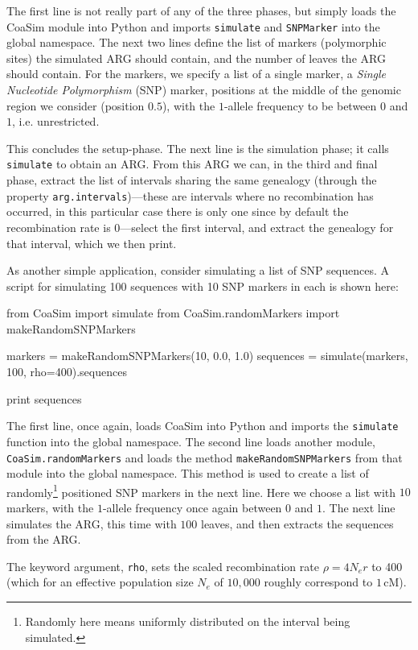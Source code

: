 \documentclass{manual}
\newcommand{\cM}{\mathrm{cM}}
\begin{document}
The first line is not really part of any of the three phases, but
simply loads the CoaSim module into Python and imports
\texttt{simulate} and \texttt{SNPMarker} into the global namespace.
The next two lines define the list of markers (polymorphic sites) the
simulated ARG should contain, and the number of leaves the ARG should
contain.  For the markers, we specify a list of a single marker, a
\emph{Single Nucleotide Polymorphism} (SNP) marker, positions at the
middle of the genomic region we consider (position $0.5$), with the
$1$-allele frequency to be between $0$ and $1$, i.e. unrestricted.

This concludes the setup-phase.  The next line is the simulation
phase; it calls \texttt{simulate} to obtain an ARG.  From this ARG we
can, in the third and final phase, extract the list of intervals
sharing the same genealogy (through the property
\texttt{arg.intervals})---these are intervals where no recombination
has occurred, in this particular case there is only one since by
default the recombination rate is $0$---select the first interval, and
extract the genealogy for that interval, which we then print.

As another simple application, consider simulating a list of SNP
sequences.  A script for simulating 100 sequences with 10 SNP markers
in each is shown here:
\begin{code}
from CoaSim import simulate
from CoaSim.randomMarkers import makeRandomSNPMarkers

markers = makeRandomSNPMarkers(10, 0.0, 1.0)
sequences = simulate(markers, 100, rho=400).sequences

print sequences
\end{code}

The first line, once again, loads CoaSim into Python and imports the
\texttt{simulate} function into the global namespace.  The second line
loads another module, \texttt{CoaSim.randomMarkers} and loads the
method \texttt{makeRandomSNPMarkers} from that module into the global
namespace.  This method is used to create a list of
randomly\footnote{Randomly here means uniformly distributed on the
  interval being simulated.} positioned SNP markers in the next line.
Here we choose a list with $10$ markers, with the $1$-allele frequency
once again between $0$ and $1$.  The next line simulates the ARG, this
time with $100$ leaves, and then extracts the sequences from the ARG.

The keyword argument, \texttt{rho}, sets the scaled recombination rate
$\rho=4N_er$ to 400 (which for an effective population size $N_e$ of
$10,000$ roughly correspond to $1\,\cM$).
\end{document}
